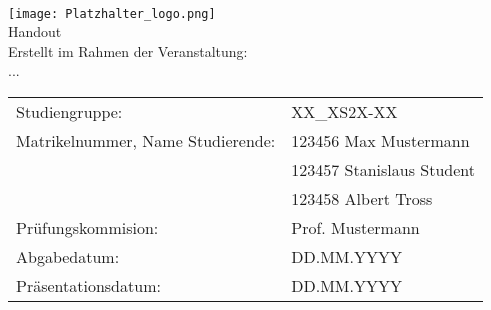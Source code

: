 \begin{center}
     \\[3ex]
    \texttt{[image: Platzhalter\_logo.png]} \\[3ex]%
    \large{Handout} \\ [-10pt]
    \large{Erstellt im Rahmen der Veranstaltung:} \\ [-10pt]
    \large{...}
\end{center}

\begin{table}[h]
    \renewcommand{\arraystretch}{2.5}%
    \setlength{\tabcolsep}{22pt}
    \begin{tabularx}{\textwidth}{l l}
        Studiengruppe:                      & XX\_XS2X-XX               \\
        Matrikelnummer, Name Studierende:   & 123456 Max Mustermann     \\ [-15pt]
        ~                                   & 123457 Stanislaus Student \\ [-15pt]
        ~                                   & 123458 Albert Tross       \\
        Prüfungskommision:                  & Prof. Mustermann          \\
        Abgabedatum:                        & DD.MM.YYYY                \\ [-15pt]
        Präsentationsdatum:                 & DD.MM.YYYY                \\
    \end{tabularx}
\end{table}

\newpage